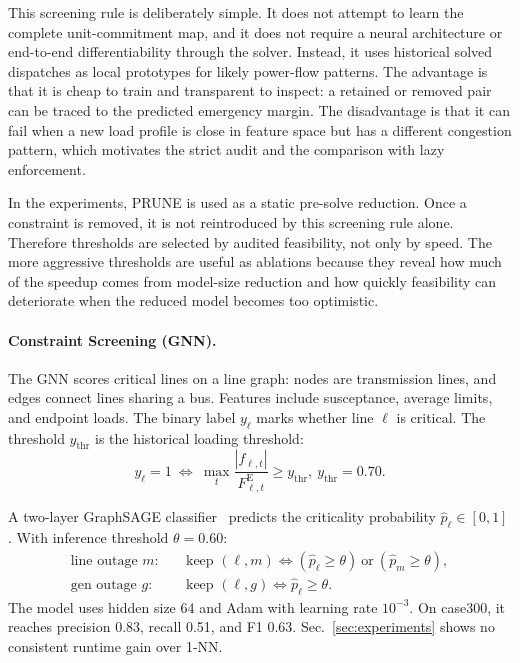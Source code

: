 \documentclass[runningheads]{llncs}
\begin{document}
This screening rule is deliberately simple. It does not attempt to learn the complete unit-commitment map, and it does not require a neural architecture or end-to-end differentiability through the solver. Instead, it uses historical solved dispatches as local prototypes for likely power-flow patterns. The advantage is that it is cheap to train and transparent to inspect: a retained or removed pair can be traced to the predicted emergency margin. The disadvantage is that it can fail when a new load profile is close in feature space but has a different congestion pattern, which motivates the strict audit and the comparison with lazy enforcement.

In the experiments, PRUNE is used as a static pre-solve reduction. Once a constraint is removed, it is not reintroduced by this screening rule alone. Therefore thresholds are selected by audited feasibility, not only by speed. The more aggressive thresholds are useful as ablations because they reveal how much of the speedup comes from model-size reduction and how quickly feasibility can deteriorate when the reduced model becomes too optimistic.

\paragraph{Constraint Screening (GNN).}

The GNN scores critical lines on a line graph: nodes are transmission lines, and edges connect lines sharing a bus. Features include susceptance, average limits, and endpoint loads. The binary label $y_\ell$ marks whether line $\ell$ is critical. The threshold $y_{\mathrm{thr}}$ is the historical loading threshold:
\begin{equation}
y_\ell= 1\ \iff\ \max_t \frac{|f_{\ell,t}|}{F^{\mathrm{E}}_{\ell,t}} \ge y_{\mathrm{thr}},\ y_{\mathrm{thr}}=0.70.
\end{equation}

A two-layer GraphSAGE classifier~\cite{Hamilton2017} predicts the criticality probability $\hat p_\ell\in[0,1]$. With inference threshold $\theta=0.60$:
\begin{align}
\text{line outage } m:\quad &\text{keep }(\ell,m)\iff (\hat p_\ell\ge\theta)\ \text{or}\ (\hat p_m\ge\theta),\\
\text{gen outage } g:\quad  &\text{keep }(\ell,g)\iff \hat p_\ell\ge\theta.
\end{align}
The model uses hidden size 64 and Adam with learning rate $10^{-3}$. On case300, it reaches precision 0.83, recall 0.51, and F1 0.63. Sec.~\ref{sec:experiments} shows no consistent runtime gain over 1-NN.
\end{document}
